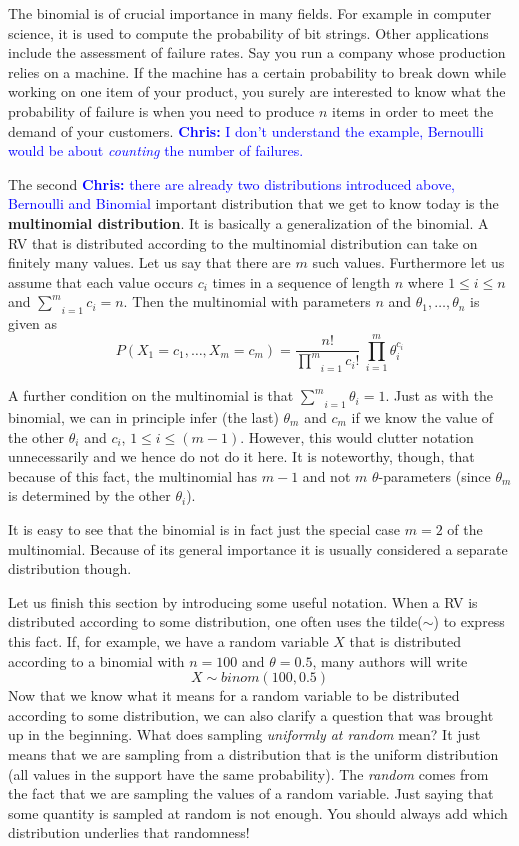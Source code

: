 \documentclass[a4paper,11pt,leqno]{report}
\newcommand{\chris}[1]{ \textcolor{blue}{\textbf{Chris:} #1}}
\begin{document}
The binomial is of crucial importance in many fields. For example in computer science, it is used to compute the probability of bit strings.
Other applications include the assessment of failure rates. Say you run a company whose production relies on a machine. If the machine
has a certain probability to break down while working on one item of your product, you surely are interested to know what the probability
of failure is when you need to produce $ n $ items in order to meet
the demand of your customers.\chris{I don't understand the example,
  Bernoulli would be about \emph{counting} the number of failures.}

The second\chris{there are already two distributions introduced above,
  Bernoulli and Binomial} important distribution that we get to know today is the \textbf{multinomial distribution}. It is basically a generalization
of the binomial. A RV that is distributed according to the multinomial distribution can take on finitely many values. Let us say that
there are $ m $ such values. Furthermore let us assume that each value occurs $ c_{i} $ times in a sequence of length $ n $ where
$ 1 \leq i \leq n $ and $ \underset{i=1}{\overset{m}{\sum}}c_{i} = n $. Then the multinomial with parameters $ n $ and 
$ \theta_{1}, \ldots, \theta_{n} $ is given as 
\begin{equation}
P(X_{1}=c_{1}, \ldots, X_{m}=c_{m}) = \dfrac{n!}{\underset{i=1}{\overset{m}{\prod}}c_{i}!}~\underset{i=1}{\overset{m}{\prod}} \theta_{i}^{c_{i}}
\end{equation}

A further condition on the multinomial is that $ \underset{i=1}{\overset{m}{\sum}}\theta_{i} = 1 $. Just as with the binomial, we can
in principle infer (the last) $ \theta_{m} $ and $ c_{m} $ if we know the value of the other $ \theta_{i} $ and $ c_{i} $, $ 1 \leq i \leq (m-1) $. However, this would
clutter notation unnecessarily and we hence do not do it here. It is noteworthy, though, that because of this fact, the multinomial
has $ m-1 $ and not $ m $ $ \theta $-parameters (since $ \theta_{m} $ is determined by the other $ \theta_i $).

It is easy to see that the binomial is in fact just the special case
$m=2$ of the multinomial. Because of its general importance it is usually
considered a separate distribution though.

Let us finish this section by introducing some useful notation. When a RV is distributed according to some distribution, one often uses
the tilde($\sim$) to express this fact. If, for example, we have a random variable $ X $ that is distributed according to a binomial with $ n=100 $
and $ \theta = 0.5 $, many authors will write
$$ X \sim binom(100, 0.5) $$
Now that we know what it means for a random variable to be distributed according to some distribution, we can also clarify a question 
that was brought up in the beginning. What does sampling \textit{uniformly at random} mean? It just means that we are sampling from
a distribution that is the uniform distribution (all values in the support have the same probability). The \textit{random} comes from the fact that
we are sampling the values of a random variable. Just saying that some quantity is sampled at random is not enough. You should
always add which distribution underlies that randomness!
\end{document}
